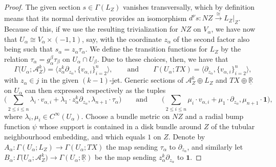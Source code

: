 \documentclass[pdftex]{sigma}
\numberwithin{equation}{section}
\begin{document}
\begin{proof}
The given section $s \in \Gamma(L_Z)$ vanishes transversally, which by definition means that its normal derivative provides an isomorphism $d^\nu s\colon NZ \stackrel{\cong}{\to} L_Z|_Z$. Because of this, if we use the resulting trivialization for $NZ$ on $V_\alpha$, we have now that $U_\alpha \cong V_\alpha \times (-1,1)$, say, with the coordinate $z_\alpha$ of the second factor also being such that $s_\alpha = z_\alpha \tau_\alpha$. We define the transition functions for $L_Z$ by the relation $\tau_\alpha = g_\alpha^\beta \tau_\beta$ on $U_\alpha \cap U_\beta$. Due to these choices, then, we have that
\begin{displaymath}
	\Gamma\big(U_\alpha; \mathcal{A}_Z^k\big) = \big\langle z_\alpha^k \partial_{z_\alpha}, \{v_{\alpha,i}\}_{i=2}^n\big\rangle, \qquad \text{and} \qquad \Gamma(U_\alpha;TX) = \big\langle \partial_{z_\alpha}, \{v_{\alpha,i}\}_{i=2}^n \big\rangle,
\end{displaymath}
with $z_\alpha \in j$ in the given $(k-1)$-jet. Generic sections of $\mathcal{A}_Z^k \oplus L_Z$ and $TX \oplus \underline{\mathbb{R}}$ on $U_\alpha$ can then expressed respectively as the tuples
\begin{displaymath}
	\bigg(\sum_{2 \leq i \leq n} \lambda_i \cdot v_{\alpha,i} + \lambda_1 \cdot z_\alpha^k \partial_{z_\alpha}, \lambda_{n+1} \cdot \tau_\alpha\bigg) \qquad \text{and} \qquad \bigg(\sum_{2\leq i \leq n} \mu_i \cdot v_{\alpha,i} + \mu_1 \cdot \partial_{z_\alpha}, \mu_{n+1} \cdot \mathbf{1}\bigg),
\end{displaymath}
where $\lambda_i, \mu_i \in C^\infty(U_\alpha)$. Choose a bundle metric on $NZ$ and a radial bump function $\psi$ whose support is contained in a disk bundle around $Z$ of the tubular neighbourhood embedding, and which equals $1$ on $Z$. Denote by $A_\alpha\colon \Gamma(U_\alpha;L_Z) \to \Gamma(U_\alpha;TX)$ the map sending $\tau_\alpha$ to $\partial_{z_\alpha}$, and similarly let $B_\alpha\colon \Gamma\big(U_\alpha;\mathcal{A}_Z^k\big) \to \Gamma(U_\alpha; \underline{\mathbb{R}})$ be the map sending $z_\alpha^k \partial_{z_\alpha}$ to $\mathbf{1}$.


\end{proof}
\end{document}
